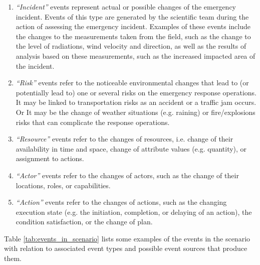 \begin{enumerate}
 	\item \emph{``Incident''} events represent actual or possible changes of the emergency incident. Events of this type are generated by the scientific team during the action of assessing the emergency incident. Examples of these events include the changes to the measurements taken from the field, such as the change to the level of radiations, wind velocity and direction, as well as the results of analysis based on these measurements, such as the increased impacted area of the incident. 
 	\item \emph{``Risk''} events refer to the noticeable environmental changes that lead to (or potentially lead to) one or several risks on the emergency response operations. It may be linked to transportation risks as an accident or a traffic jam occurs. Or It may be the change of weather situations (e.g. raining) or fire/explosions risks that can complicate the response operations. 
 	\item \emph{``Resource''} events refer to the changes of resources, i.e. change of their availability in time and space, change of attribute values (e.g. quantity), or assignment to actions.
 	\item \emph{``Actor''} events refer to the changes of actors, such as the change of their locations, roles, or capabilities.
 	\item \emph{``Action''} events refer to the changes of actions, such as the changing execution state (e.g. the initiation, completion, or delaying of an action), the condition satisfaction, or the change of plan. 
 \end{enumerate} 

Table \ref{tab:events_in_scenario} lists some examples of the events in the scenario with relation to associated event types and possible event sources that produce them.

